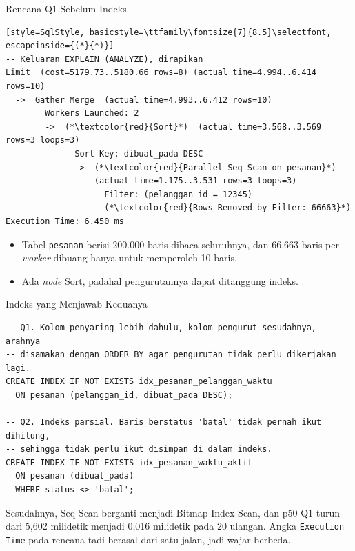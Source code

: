 \documentclass[aspectratio=169, table, 12pt]{beamer}
\begin{document}
\begin{frame}[fragile]{{\Large Rencana Q1 Sebelum Indeks}}
  \vspace{2pt}
\begin{lstlisting}[style=SqlStyle, basicstyle=\ttfamily\fontsize{7}{8.5}\selectfont, escapeinside={(*}{*)}]
-- Keluaran EXPLAIN (ANALYZE), dirapikan
Limit  (cost=5179.73..5180.66 rows=8) (actual time=4.994..6.414 rows=10)
  ->  Gather Merge  (actual time=4.993..6.412 rows=10)
        Workers Launched: 2
        ->  (*\textcolor{red}{Sort}*)  (actual time=3.568..3.569 rows=3 loops=3)
              Sort Key: dibuat_pada DESC
              ->  (*\textcolor{red}{Parallel Seq Scan on pesanan}*)
                  (actual time=1.175..3.531 rows=3 loops=3)
                    Filter: (pelanggan_id = 12345)
                    (*\textcolor{red}{Rows Removed by Filter: 66663}*)
Execution Time: 6.450 ms
\end{lstlisting}

  \vspace{2pt}
  \begin{itemize}
    \item Tabel \texttt{pesanan} berisi 200.000 baris dibaca seluruhnya, dan
          66.663 baris per \textit{worker} dibuang hanya untuk memperoleh 10 baris.
    \item Ada \textit{node} Sort, padahal pengurutannya dapat ditanggung indeks.
  \end{itemize}
\end{frame}

\begin{frame}[fragile]{{\Large Indeks yang Menjawab Keduanya}}
  \vspace{2pt}
\begin{lstlisting}[style=SqlStyle]
-- Q1. Kolom penyaring lebih dahulu, kolom pengurut sesudahnya, arahnya
-- disamakan dengan ORDER BY agar pengurutan tidak perlu dikerjakan lagi.
CREATE INDEX IF NOT EXISTS idx_pesanan_pelanggan_waktu
  ON pesanan (pelanggan_id, dibuat_pada DESC);

-- Q2. Indeks parsial. Baris berstatus 'batal' tidak pernah ikut dihitung,
-- sehingga tidak perlu ikut disimpan di dalam indeks.
CREATE INDEX IF NOT EXISTS idx_pesanan_waktu_aktif
  ON pesanan (dibuat_pada)
  WHERE status <> 'batal';
\end{lstlisting}

  \vspace{2pt}
  {\footnotesize Sesudahnya, Seq Scan berganti menjadi Bitmap Index Scan, dan
  p50 Q1 turun dari 5,602 milidetik menjadi 0,016 milidetik pada 20 ulangan.
  Angka \texttt{Execution Time} pada rencana tadi berasal dari satu jalan, jadi
  wajar berbeda.}
\end{frame}
\end{document}
